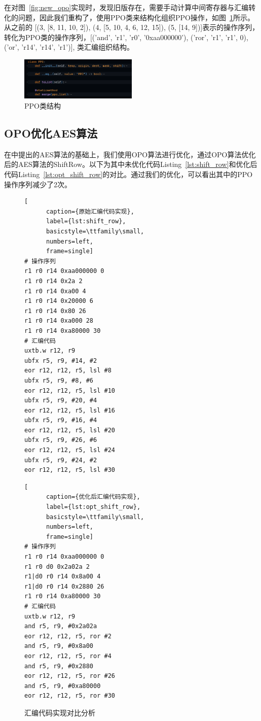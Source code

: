 \documentclass[11pt,a4paper]{article}
\begin{document}
在对图~\ref{fig:new_opo}实现时，发现旧版存在，需要手动计算中间寄存器与汇编转化的问题，因此我们重构了，使用PPO类来结构化组织PPO操作，如图~\ref{fig:ppo}所示。 从之前的 [(3, [8, 11, 10, 2]), (4, [5, 10, 4, 6, 12, 15]), (5, [14, 9])]表示的操作序列，转化为PPO类的操作序列，[('and', 'r1', 'r0', '0xaa000000'), ('ror', 'r1', 'r1', 0), ('or', 'r14', 'r14', 'r1')], 类汇编组织结构。

\begin{figure}[h]
  \centering
  \includegraphics[width=0.5\textwidth]{./fig/ppo_class.png}
  \caption{PPO类结构}
  \label{fig:ppo}
\end{figure}

\subsection{OPO优化AES算法}
在\cite{Schwabe2016}中提出的AES算法的基础上，我们使用OPO算法进行优化，通过OPO算法优化后的AES算法的ShiftRow。以下为其中未优化代码Listing~\ref{lst:shift_row}和优化后代码Listing~\ref{lst:opt_shift_row}的对比。通过我们的优化，可以看出其中的PPO操作序列减少了2次。

\begin{figure}[ht]
  \begin{minipage}{\textwidth}
  \begin{multicols}{2}
  \begin{lstlisting}[
      caption={原始汇编代码实现},
      label={lst:shift_row},
      basicstyle=\ttfamily\small,
      numbers=left,
      frame=single]
# 操作序列
r1 r0 r14 0xaa000000 0
r1 r0 r14 0x2a 2
r1 r0 r14 0xa00 4
r1 r0 r14 0x20000 6
r1 r0 r14 0x80 26
r1 r0 r14 0xa000 28
r1 r0 r14 0xa80000 30
# 汇编代码
uxtb.w r12, r9
ubfx r5, r9, #14, #2
eor r12, r12, r5, lsl #8
ubfx r5, r9, #8, #6
eor r12, r12, r5, lsl #10
ubfx r5, r9, #20, #4
eor r12, r12, r5, lsl #16
ubfx r5, r9, #16, #4
eor r12, r12, r5, lsl #20
ubfx r5, r9, #26, #6
eor r12, r12, r5, lsl #24
ubfx r5, r9, #24, #2
eor r12, r12, r5, lsl #30
  \end{lstlisting}
  \columnbreak
  \begin{lstlisting}[
      caption={优化后汇编代码实现},
      label={lst:opt_shift_row},
      basicstyle=\ttfamily\small,
      numbers=left,
      frame=single]
# 操作序列
r1 r0 r14 0xaa000000 0
r1 r0 d0 0x2a02a 2
r1|d0 r0 r14 0x8a00 4
r1|d0 r0 r14 0x2880 26
r1 r0 r14 0xa80000 30
# 汇编代码
uxtb.w r12, r9
and r5, r9, #0x2a02a
eor r12, r12, r5, ror #2
and r5, r9, #0x8a00
eor r12, r12, r5, ror #4
and r5, r9, #0x2880
eor r12, r12, r5, ror #26
and r5, r9, #0xa80000
eor r12, r12, r5, ror #30
  \end{lstlisting}
  \end{multicols}
  \caption{汇编代码实现对比分析}
  \label{fig:code_comparison}
  \end{minipage}
\end{figure}
\end{document}
